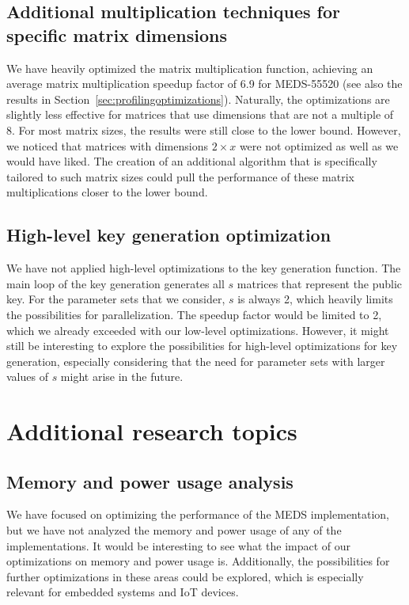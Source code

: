\documentclass[11pt,a4paper]{report}
\theoremstyle{definition}
\begin{document}
\subsection*{Additional multiplication techniques for specific matrix dimensions}
We have heavily optimized the matrix multiplication function, achieving an average matrix multiplication speedup factor of 6.9 for MEDS-55520 (see also the results in Section~\ref{sec:profilingoptimizations}). Naturally, the optimizations are slightly less effective for matrices that use dimensions that are not a multiple of 8. For most matrix sizes, the results were still close to the lower bound. However, we noticed that matrices with dimensions $2 \times x$ were not optimized as well as we would have liked. The creation of an additional algorithm that is specifically tailored to such matrix sizes could pull the performance of these matrix multiplications closer to the lower bound.

\subsection*{High-level key generation optimization}
We have not applied high-level optimizations to the key generation function. The main loop of the key generation generates all $s$ matrices that represent the public key. For the parameter sets that we consider, $s$ is always 2, which heavily limits the possibilities for parallelization. The speedup factor would be limited to 2, which we already exceeded with our low-level optimizations. However, it might still be interesting to explore the possibilities for high-level optimizations for key generation, especially considering that the need for parameter sets with larger values of $s$ might arise in the future.

\section{Additional research topics}
\label{sec:futureworkresearch}

\subsection*{Memory and power usage analysis}
We have focused on optimizing the performance of the MEDS implementation, but we have not analyzed the memory and power usage of any of the implementations. It would be interesting to see what the impact of our optimizations on memory and power usage is. Additionally, the possibilities for further optimizations in these areas could be explored, which is especially relevant for embedded systems and IoT devices.
\end{document}
